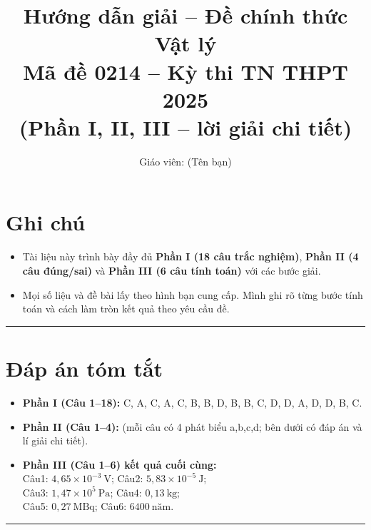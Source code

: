 \documentclass[12pt,a4paper]{article}
\title{Hướng dẫn giải -- Đề chính thức Vật lý \\ Mã đề 0214 -- Kỳ thi TN THPT 2025\\[4pt]
\small (Phần I, II, III -- lời giải chi tiết)}
\author{Giáo viên: (Tên bạn)}
\date{}
\begin{document}
\maketitle

\section*{Ghi chú}
\begin{itemize}
  \item Tài liệu này trình bày đầy đủ \textbf{Phần I (18 câu trắc nghiệm)}, \textbf{Phần II (4 câu đúng/sai)} và \textbf{Phần III (6 câu tính toán)} với các bước giải. 
  \item Mọi số liệu và đề bài lấy theo hình bạn cung cấp. Mình ghi rõ từng bước tính toán và cách làm tròn kết quả theo yêu cầu đề.
\end{itemize}

\hrule
\section*{Đáp án tóm tắt}
\begin{itemize}
  \item \textbf{Phần I (Câu 1--18):} C, A, C, A, C, B, B, D, B, B, C, D, D, A, D, D, B, C.
  \item \textbf{Phần II (Câu 1--4):} (mỗi câu có 4 phát biểu a,b,c,d; bên dưới có đáp án và lí giải chi tiết).
  \item \textbf{Phần III (Câu 1--6) kết quả cuối cùng:}\\
  Câu1: $4{,}65\times10^{-3}\ \text{V}$; \quad
  Câu2: $5{,}83\times10^{-5}\ \text{J}$;\\
  Câu3: $1{,}47\times10^{5}\ \text{Pa}$; \quad
  Câu4: $0{,}13\ \text{kg}$;\\
  Câu5: $0{,}27\ \text{MBq}$; \quad
  Câu6: $6400\ \text{năm}$.
\end{itemize}

\hrule
\end{document}
